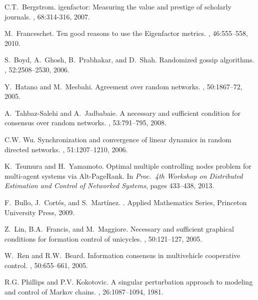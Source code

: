 \documentclass[11pt,draftcls,onecolumn]{IEEEtran}
\begin{document}
\begin{table}[t]
\begin{thebibliography}{1}
C.{\;}T.~Bergstrom.
igenfactor:  {M}easuring the value and prestige of scholarly journals.
, 68:314-­316, 2007.

M.~Franceschet.
\newblock Ten good reasons to use the Eigenfactor metrics.
, 46:555--558, 2010.

S.~Boyd, A.~Ghosh, B.~Prabhakar, and D.~Shah.
\newblock Randomized gossip algorithms.
, 52:2508--2530, 2006.

Y.~Hatano and M.~Mesbahi.
\newblock Agreement over random networks.
, 50:1867--72, 2005.

A.~Tahbaz-Salehi and A.~Jadbabaie.
\newblock A necessary and sufficient condition for consensus over random
  networks.
, 53:791--795, 2008.

C.{\;}W. Wu.
\newblock Synchronization and convergence of linear dynamics in random directed
  networks.
, 51:1207--1210, 2006.

K.~Tsumura and H.~Yamamoto.
\newblock Optimal multiple controlling nodes problem 
for multi-agent systems via Alt-PageRank.
\newblock In {\em Proc.\ {\rm 4}th Workshop on Distributed Estimation and 
Control of Networked Systems}, pages 433--438, 2013.



F.~Bullo, J.~Cort\'{e}s, and S.\ Mart\'{i}nez.
.
\newblock Applied Mathematics Series,
Princeton University Press, 2009.

Z.~Lin, B.{\;}A.~Francis, and M.~Maggiore. 
\newblock Necessary and sufficient graphical conditions for formation control 
of unicycles. 
, 50:121--127, 2005.

W.~Ren and R.{\;}W.~Beard. 
\newblock Information consensus in multivehicle cooperative control. 
, 50:655--661, 2005.


R.{\;}G. Phillips and P.{\;}V. Kokotovic.
\newblock A singular perturbation approach to modeling and control of {M}arkov
  chains.
, 26:1087--1094, 1981.


\end{thebibliography}
\end{table}
\end{document}
